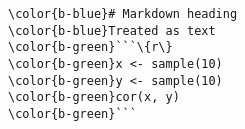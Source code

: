 \documentclass[class=minimal,border=0]{standalone}
\begin{document}
%
\begin{BVerbatim}[bgcolor=b-darkgrey]
\color{b-blue}# Markdown heading
\color{b-blue}Treated as text
\color{b-green}```\{r\}
\color{b-green}x <- sample(10)
\color{b-green}y <- sample(10)
\color{b-green}cor(x, y)
\color{b-green}```
\end{BVerbatim}
\end{document}
